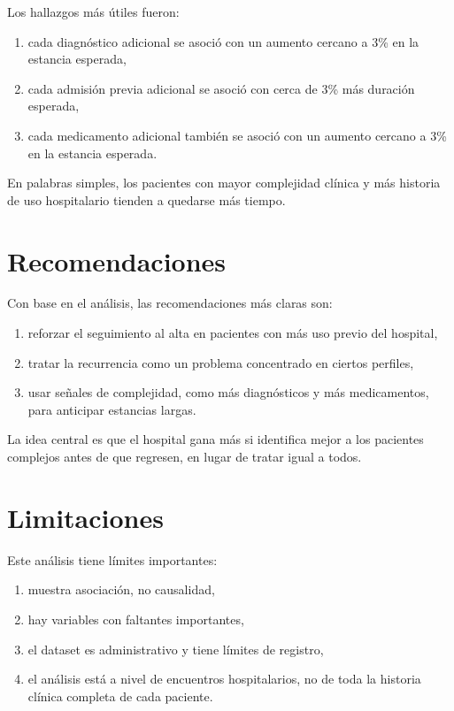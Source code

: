 \documentclass[12pt]{article}
\begin{document}
Los hallazgos más útiles fueron:
\begin{enumerate}[leftmargin=1.6em]
    \item cada diagnóstico adicional se asoció con un aumento cercano a 3\% en la estancia esperada,
    \item cada admisión previa adicional se asoció con cerca de 3\% más duración esperada,
    \item cada medicamento adicional también se asoció con un aumento cercano a 3\% en la estancia esperada.
\end{enumerate}

En palabras simples, los pacientes con mayor complejidad clínica y más historia de uso hospitalario tienden a quedarse más tiempo.

\section{Recomendaciones}

Con base en el análisis, las recomendaciones más claras son:
\begin{enumerate}[leftmargin=1.6em]
    \item reforzar el seguimiento al alta en pacientes con más uso previo del hospital,
    \item tratar la recurrencia como un problema concentrado en ciertos perfiles,
    \item usar señales de complejidad, como más diagnósticos y más medicamentos, para anticipar estancias largas.
\end{enumerate}

La idea central es que el hospital gana más si identifica mejor a los pacientes complejos antes de que regresen, en lugar de tratar igual a todos.

\section{Limitaciones}

Este análisis tiene límites importantes:
\begin{enumerate}[leftmargin=1.6em]
    \item muestra asociación, no causalidad,
    \item hay variables con faltantes importantes,
    \item el dataset es administrativo y tiene límites de registro,
    \item el análisis está a nivel de encuentros hospitalarios, no de toda la historia clínica completa de cada paciente.
\end{enumerate}
\end{document}

